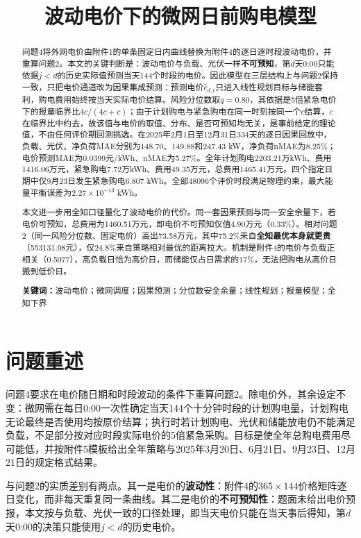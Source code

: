 \documentclass[UTF8,12pt]{ctexart}
\title{波动电价下的微网日前购电模型}
\author{}
\date{}
\begin{document}
\maketitle

\begin{abstract}
问题4将外网电价由附件1的单条固定日内曲线替换为附件4的逐日逐时段波动电价，并重算问题2。本文的关键判断是：波动电价与负载、光伏一样\textbf{不可预知}，第$d$天0:00只能依据$j<d$的历史实际值预测当天144个时段的电价。因此模型在三层结构上与问题2保持一致，只把电价通道改为因果集成预测：预测电价$\hat c_{d,t}$只进入线性规划目标与储能套利，购电费用始终按当天实际电价结算。风险分位数取$q=0.80$，其依据是5倍紧急电价下的报童临界比$4c/(4c+c)$；由于计划购电与紧急购电在同一时刻按同一个$c$结算，$c$在临界比中约去，故该值与电价的取值、分布、是否可预知均无关，是事前给定的理论值，不由任何评价期回测挑选。在2025年2月1日至12月31日334天的逐日因果回放中，负载、光伏、净负荷MAE分别为148.70、149.88和247.43 kW，净负荷nMAE为8.25\%；电价预测MAE为0.0399元/kWh、nMAE为5.27\%。全年计划购电2203.21万kWh、费用1416.06万元，紧急购电7.72万kWh、费用49.35万元，总费用1465.41万元。四个指定日期中仅9月23日发生紧急购电6.807 kWh。全部48096个评价时段满足物理约束，最大能量平衡误差为$2.27\times10^{-13}$ kWh。

本文进一步用全知口径量化了波动电价的代价。同一套因果预测与同一安全余量下，若电价可预知，总费用为1460.51万元，即电价不可预知仅值4.90万元（0.33\%）。相对问题2（同一风险分位数、固定电价）高出73.58万元，其中75.2\%来自\textbf{全知最优本身就更贵}（553131.08元），仅24.8\%来自策略相对最优的距离拉大。机制是附件4的电价与负载正相关（0.5077），高负载日恰为高价日，而储能仅占日需求的17\%，无法把购电从高价日搬到低价日。

\textbf{关键词：}波动电价；微网调度；因果预测；分位数安全余量；线性规划；报童模型；全知下界
\end{abstract}

\section{问题重述}
问题4要求在电价随日期和时段波动的条件下重算问题2。除电价外，其余设定不变：微网需在每日0:00一次性确定当天144个十分钟时段的计划购电量，计划购电无论最终是否使用均按原价结算；执行时若计划购电、光伏和储能放电仍不能满足负载，不足部分按对应时段实际电价的5倍紧急采购。目标是使全年总购电费用尽可能低，并按附件5模板给出全年策略与2025年3月20日、6月21日、9月23日、12月21日的规定格式结果。

与问题2的实质差别有两点。其一是电价的\textbf{波动性}：附件4的$365\times144$价格矩阵逐日变化，而非每天重复同一条曲线。其二是电价的\textbf{不可预知性}：题面未给出电价预报，本文按与负载、光伏一致的口径处理，即当天电价只能在当天事后得知，第$d$天0:00的决策只能使用$j<d$的历史电价。
\end{document}
